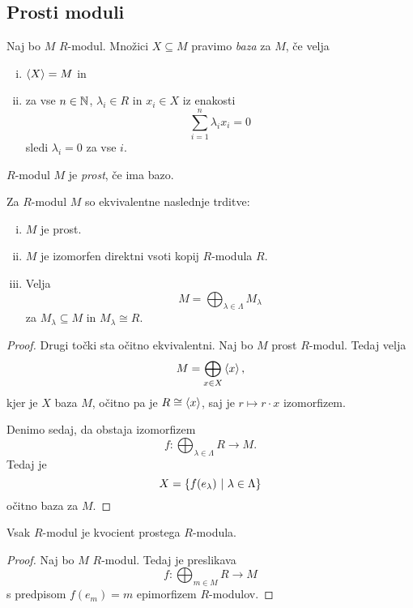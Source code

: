 \subsection{Prosti moduli}

\begin{definicija}
Naj bo $M$ $R$-modul. Množici $X \subseteq M$ pravimo
\emph{baza} za $M$, če velja

\begin{enumerate}[i)]
\item $\left\langle X\right\rangle = M$ in
\item za vse $n \in \mathbb{N}$, $\lambda_i \in R$ in $x_i \in X$ iz
enakosti
\[
\sum_{i=1}^n \lambda_i x_i = 0
\]
sledi $\lambda_i = 0$ za vse $i$.
\end{enumerate}
\end{definicija}

\begin{definicija}
$R$-modul $M$ je \emph{prost}, če ima bazo.
\end{definicija}

\begin{izrek}
Za $R$-modul $M$ so ekvivalentne naslednje trditve:

\begin{enumerate}[i)]
\item $M$ je prost.
\item $M$ je izomorfen direktni vsoti kopij $R$-modula $R$.
\item Velja
\[
M = \bigoplus_{\lambda \in \Lambda} M_\lambda
\]
za $M_\lambda \subseteq M$ in $M_\lambda \cong R$.
\end{enumerate}
\end{izrek}

\begin{proof}
Drugi točki sta očitno ekvivalentni. Naj bo $M$ prost $R$-modul.
Tedaj velja
\[
M = \bigoplus_{x \in X} \left\langle x\right\rangle,
\]
kjer je $X$ baza $M$, očitno pa je $R \cong \left\langle x\right\rangle$, saj je
$r \mapsto r \cdot x$ izomorfizem.

Denimo sedaj, da obstaja izomorfizem
\[
f \colon \bigoplus_{\lambda \in \Lambda} R \to M.
\]
Tedaj je
\[
X = \left\{f(e_\lambda)~\middle\vert~\lambda \in \Lambda\right\}
\]
očitno baza za $M$.
\end{proof}

\begin{posledica}
Vsak $R$-modul je kvocient prostega $R$-modula.
\end{posledica}

\begin{proof}
Naj bo $M$ $R$-modul. Tedaj je preslikava
\[
f \colon \bigoplus_{m \in M} R \to M
\]
s predpisom $f(e_m) = m$ epimorfizem $R$-modulov.
\end{proof}

